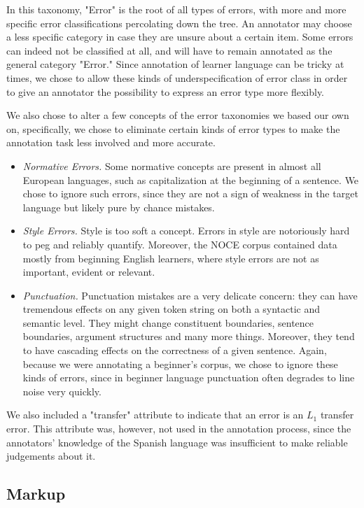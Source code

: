 \documentclass[12pt]{article}
\begin{document}
In this taxonomy, "Error" is the root of all types of errors, with more and more
specific error classifications percolating down the tree. An annotator may
choose a less specific category in case they are unsure about a certain item.
Some errors can indeed not be classified at all, and will have to remain
annotated as the general category "Error." Since annotation of learner language
can be tricky at times, we chose to allow these kinds of underspecification of
error class in order to give an annotator the possibility to express an error
type more flexibly.

We also chose to alter a few concepts of the error taxonomies we based our own
on, specifically, we chose to eliminate certain kinds of error types to make the
annotation task less involved and more accurate.

\begin{itemize}
  \item \textit{Normative Errors.} Some normative concepts are present in almost
  all European languages, such as capitalization at the beginning of a sentence.
  We chose to ignore such errors, since they are not a sign of weakness in the
  target language but likely pure by chance mistakes.
  \item \textit{Style Errors.} Style is too soft a concept. Errors in style are
  notoriously hard to peg and reliably quantify. Moreover, the NOCE corpus
  contained data mostly from beginning English learners, where style errors are
  not as important, evident or relevant.
  \item \textit{Punctuation.} Punctuation mistakes are a very delicate concern:
  they can have tremendous effects on any given token string on both a syntactic
  and semantic level. They might change constituent boundaries, sentence
  boundaries, argument structures and many more things. Moreover, they tend to
  have cascading effects on the correctness of a given sentence. Again, because
  we were annotating a beginner's corpus, we chose to ignore these kinds of
  errors, since in beginner language punctuation often degrades to line noise
  very quickly.
\end{itemize}

We also included a "transfer" attribute to indicate that an error is an $L_1$
transfer error. This attribute was, however, not used in the annotation process,
since the annotators' knowledge of the Spanish language was insufficient to
make reliable judgements about it.

\subsection{Markup}
\end{document}
